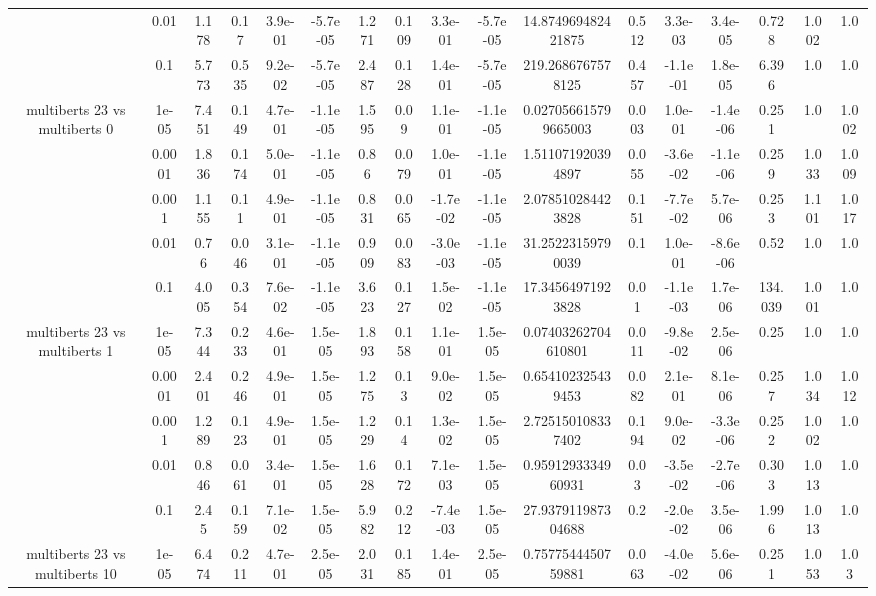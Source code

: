 \begin{tabular}{|c|c|c|c|c|c|c|c|c|c|c|c|c|c|c|c|c|}
 & 0.01 & 1.178 & 0.17 & 3.9e-01 & -5.7e-05 & 1.271 & 0.109 & 3.3e-01 & -5.7e-05 & 14.874969482421875 & 0.512 & 3.3e-03 & 3.4e-05 & 0.728 & 1.002 & 1.0 \\
 & 0.1 & 5.773 & 0.535 & 9.2e-02 & -5.7e-05 & 2.487 & 0.128 & 1.4e-01 & -5.7e-05 & 219.2686767578125 & 0.457 & -1.1e-01 & 1.8e-05 & 6.396 & 1.0 & 1.0 \\
\hline
\multirow{5}{*}{multiberts 23 vs multiberts 0} & 1e-05 & 7.451 & 0.149 & 4.7e-01 & -1.1e-05 & 1.595 & 0.09 & 1.1e-01 & -1.1e-05 & 0.027056615799665003 & 0.003 & 1.0e-01 & -1.4e-06 & 0.251 & 1.0 & 1.002 \\
 & 0.0001 & 1.836 & 0.174 & 5.0e-01 & -1.1e-05 & 0.86 & 0.079 & 1.0e-01 & -1.1e-05 & 1.511071920394897 & 0.055 & -3.6e-02 & -1.1e-06 & 0.259 & 1.033 & 1.009 \\
 & 0.001 & 1.155 & 0.11 & 4.9e-01 & -1.1e-05 & 0.831 & 0.065 & -1.7e-02 & -1.1e-05 & 2.078510284423828 & 0.151 & -7.7e-02 & 5.7e-06 & 0.253 & 1.101 & 1.017 \\
 & 0.01 & 0.76 & 0.046 & 3.1e-01 & -1.1e-05 & 0.909 & 0.083 & -3.0e-03 & -1.1e-05 & 31.25223159790039 & 0.1 & 1.0e-01 & -8.6e-06 & 0.52 & 1.0 & 1.0 \\
 & 0.1 & 4.005 & 0.354 & 7.6e-02 & -1.1e-05 & 3.623 & 0.127 & 1.5e-02 & -1.1e-05 & 17.34564971923828 & 0.01 & -1.1e-03 & 1.7e-06 & 134.039 & 1.001 & 1.0 \\
\hline
\multirow{5}{*}{multiberts 23 vs multiberts 1} & 1e-05 & 7.344 & 0.233 & 4.6e-01 & 1.5e-05 & 1.893 & 0.158 & 1.1e-01 & 1.5e-05 & 0.07403262704610801 & 0.011 & -9.8e-02 & 2.5e-06 & 0.25 & 1.0 & 1.0 \\
 & 0.0001 & 2.401 & 0.246 & 4.9e-01 & 1.5e-05 & 1.275 & 0.13 & 9.0e-02 & 1.5e-05 & 0.654102325439453 & 0.082 & 2.1e-01 & 8.1e-06 & 0.257 & 1.034 & 1.012 \\
 & 0.001 & 1.289 & 0.123 & 4.9e-01 & 1.5e-05 & 1.229 & 0.14 & 1.3e-02 & 1.5e-05 & 2.725150108337402 & 0.194 & 9.0e-02 & -3.3e-06 & 0.252 & 1.002 & 1.0 \\
 & 0.01 & 0.846 & 0.061 & 3.4e-01 & 1.5e-05 & 1.628 & 0.172 & 7.1e-03 & 1.5e-05 & 0.9591293334960931 & 0.03 & -3.5e-02 & -2.7e-06 & 0.303 & 1.013 & 1.0 \\
 & 0.1 & 2.45 & 0.159 & 7.1e-02 & 1.5e-05 & 5.982 & 0.212 & -7.4e-03 & 1.5e-05 & 27.937911987304688 & 0.2 & -2.0e-02 & 3.5e-06 & 1.996 & 1.013 & 1.0 \\
\hline
\multirow{5}{*}{multiberts 23 vs multiberts 10} & 1e-05 & 6.474 & 0.211 & 4.7e-01 & 2.5e-05 & 2.031 & 0.185 & 1.4e-01 & 2.5e-05 & 0.7577544450759881 & 0.063 & -4.0e-02 & 5.6e-06 & 0.251 & 1.053 & 1.03 \\

\end{tabular}
